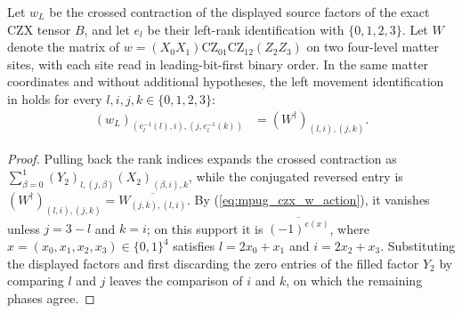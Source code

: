 \begin{lemma}
    \label{thm:mpug_czx_displayed_left_movement_coordinates}
    \leanok
    Let $w_L$ be the crossed contraction of the displayed source factors
    of the exact CZX tensor $B$, and let $e_l$ be their left-rank
    identification with $\{0,1,2,3\}$. Let $W$ denote the matrix of
    $w=(X_0X_1)\mathrm{CZ}_{01}\mathrm{CZ}_{12}(Z_2Z_3)$ on two
    four-level matter sites, with each site read in leading-bit-first
    binary order. In the same matter coordinates and without additional
    hypotheses, the left movement identification in
    \cite[lines~811--869, 4559--4659, 4860--4888]{FrancoRubio2025MPUGauging}
    holds for every $l,i,j,k\in\{0,1,2,3\}$:
    \begin{align}
        (w_L)_{(e_l^{-1}(l),i),(j,e_l^{-1}(k))}
         & =(W^\dagger)_{(l,i),(j,k)}.
    \end{align}
\end{lemma}

\begin{proof}\leanok
    Pulling back the rank indices expands the crossed contraction as
    $\sum_{\beta=0}^1(Y_2)_{l,(j,\beta)}(X_2)_{(\beta,i),k}$, while the
    conjugated reversed entry is
    $(W^\dagger)_{(l,i),(j,k)}=\overline{W_{(j,k),(l,i)}}$.
    By (\ref{eq:mpug_czx_w_action}), it vanishes unless $j=3-l$ and
    $k=i$; on this support it is $\overline{(-1)^{e(x)}}$, where
    $x=(x_0,x_1,x_2,x_3)\in\{0,1\}^4$ satisfies
    $l=2x_0+x_1$ and $i=2x_2+x_3$.
    Substituting the displayed factors and first discarding the zero
    entries of the filled factor $Y_2$ by comparing $l$ and $j$ leaves
    the comparison of $i$ and $k$, on which the remaining phases agree.
\end{proof}


